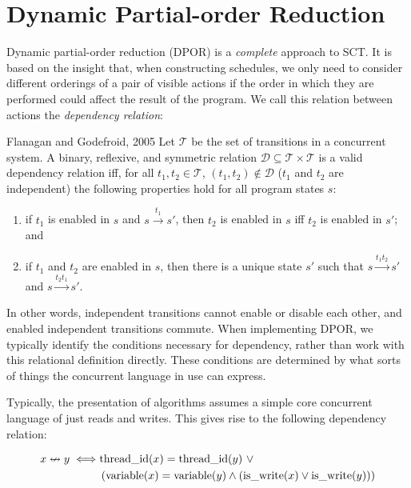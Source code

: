 \section{Dynamic Partial-order Reduction}
\label{sec:sct-dpor}

Dynamic partial-order reduction (DPOR)\cite{flanagan2005,godefroid1996} is a
\emph{complete} approach to SCT\@.  It is based on the insight that, when
constructing schedules, we only need to consider different orderings of a pair
of visible actions if the order in which they are performed could affect the
result of the program.  We call this relation between actions
the \emph{dependency relation}:

\begin{bquote}{Flanagan and Godefroid, 2005\nocite{flanagan2005}}
  Let $\mathcal T$ be the set of transitions in a concurrent system.  A binary,
  reflexive, and symmetric relation $\mathcal D \subseteq \mathcal
  T \times \mathcal T$ is a valid dependency relation iff, for all $t_{1},
  t_{2} \in \mathcal T$, $(t_{1}, t_{2}) \notin \mathcal D$ ($t_{1}$ and $t_{2}$
  are independent) the following properties hold for all program states $s$:

  \begin{enumerate}
  \item if $t_{1}$ is enabled in $s$ and $s \xrightarrow{t_{1}} s'$, then
    $t_{2}$ is enabled in $s$ iff $t_{2}$ is enabled in $s'$; and

  \item if $t_{1}$ and $t_{2}$ are enabled in $s$, then there is a unique state
    $s'$ such that $s \xrightarrow{t_{1}t_{2}} s'$ and
    $s \xrightarrow{t_{2}t_{1}} s'$.
  \end{enumerate}
\end{bquote}

In other words, independent transitions cannot enable or disable each other, and
enabled independent transitions commute.  When implementing DPOR, we typically
identify the conditions necessary for dependency, rather than work with this
relational definition directly.  These conditions are determined by what sorts
of things the concurrent language in use can express.

Typically, the presentation of algorithms assumes a simple core concurrent
language of just reads and writes.  This gives rise to the following dependency
relation:

\begin{align*}
  x \nleftrightarrow y \iff& \mathrm{thread\_id}(x) = \mathrm{thread\_id}(y)~\lor\\
    &\left(\mathrm{variable}(x) = \mathrm{variable}(y)
     \land \left(\mathrm{is\_write}(x) \lor \mathrm{is\_write}(y)\right)\right)
\end{align*}

